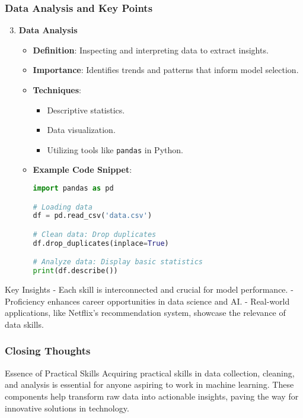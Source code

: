 \documentclass[aspectratio=169]{beamer}
\begin{document}
\begin{frame}[fragile]
    \frametitle{Data Analysis and Key Points}
    \begin{enumerate}
        \setcounter{enumi}{2} %
        \item \textbf{Data Analysis}
            \begin{itemize}
                \item \textbf{Definition}: Inspecting and interpreting data to extract insights.
                \item \textbf{Importance}: Identifies trends and patterns that inform model selection.
                \item \textbf{Techniques}:
                    \begin{itemize}
                        \item Descriptive statistics.
                        \item Data visualization.
                        \item Utilizing tools like \texttt{pandas} in Python.
                    \end{itemize}
                \item \textbf{Example Code Snippet}:
                \begin{lstlisting}[language=Python]
import pandas as pd

# Loading data
df = pd.read_csv('data.csv')

# Clean data: Drop duplicates
df.drop_duplicates(inplace=True)

# Analyze data: Display basic statistics
print(df.describe())
                \end{lstlisting}
            \end{itemize}
    \end{enumerate}
    
    \begin{block}{Key Insights}
        - Each skill is interconnected and crucial for model performance.
        - Proficiency enhances career opportunities in data science and AI.
        - Real-world applications, like Netflix's recommendation system, showcase the relevance of data skills.
    \end{block}
\end{frame}

\begin{frame}[fragile]
    \frametitle{Closing Thoughts}
    \begin{block}{Essence of Practical Skills}
        Acquiring practical skills in data collection, cleaning, and analysis is essential for anyone aspiring to work in machine learning. 
        These components help transform raw data into actionable insights, paving the way for innovative solutions in technology.
    \end{block}
\end{frame}
\end{document}
